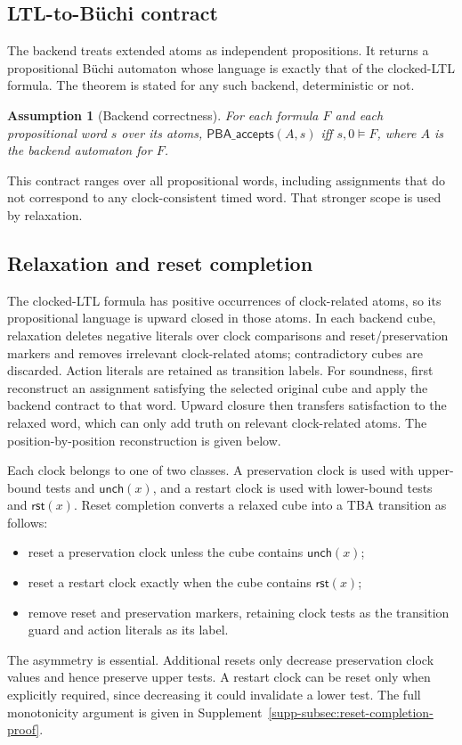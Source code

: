 \documentclass[10pt,journal,compsoc]{IEEEtran}
\newtheorem{assumption}[theorem]{Assumption}
\newcommand{\Reset}{\mathsf{rst}}
\newcommand{\Unch}{\mathsf{unch}}
\begin{document}
\subsection{LTL-to-B\"uchi contract}
The backend treats extended atoms as independent propositions. It returns a
propositional B\"uchi automaton whose language is exactly that of the
clocked-LTL formula. The theorem is stated for any such backend, deterministic
or not.
\begin{assumption}[Backend correctness]
\label{ass:backend}
For each formula $F$ and each propositional word $s$ over its atoms,
$\mathsf{PBA\_accepts}(A,s)$ iff $s,0\models F$, where $A$ is the backend
automaton for $F$.
\end{assumption}
This contract ranges over all propositional words, including assignments
that do not correspond to any clock-consistent timed word. That stronger
scope is used by relaxation.

\subsection{Relaxation and reset completion}
\label{sec:reset-completion}
The clocked-LTL formula has positive occurrences of clock-related atoms, so
its propositional language is upward closed in those atoms. In each backend
cube, relaxation deletes negative literals over clock comparisons and
reset/preservation markers and removes irrelevant clock-related atoms;
contradictory cubes are discarded. Action literals are retained as transition
labels. For soundness, first reconstruct an assignment satisfying the
selected original cube and apply the backend contract to that word. Upward
closure then transfers satisfaction to the relaxed word, which can only add
truth on relevant clock-related atoms. The position-by-position
reconstruction is given below.

Each clock belongs to one of two classes. A preservation clock is used with
upper-bound tests and $\Unch(x)$, and a restart clock is used with
lower-bound tests and $\Reset(x)$. Reset completion converts a relaxed cube
into a TBA transition as follows:
\begin{itemize}
  \item reset a preservation clock unless the cube contains $\Unch(x)$;
  \item reset a restart clock exactly when the cube contains $\Reset(x)$;
  \item remove reset and preservation markers, retaining clock tests as the
        transition guard and action literals as its label.
\end{itemize}
The asymmetry is essential. Additional resets only decrease preservation
clock values and hence preserve upper tests. A restart clock can be reset
only when explicitly required, since decreasing it could invalidate a lower
test. The full monotonicity argument is given in
Supplement~\ref{supp-subsec:reset-completion-proof}.
\end{document}
